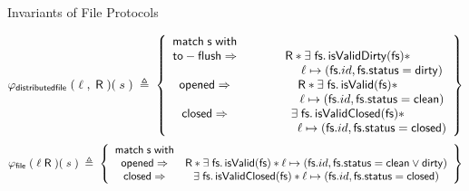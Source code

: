 \documentclass[aspectratio=169,xcolor=dvipsnames]{beamer}
\begin{document}
\begin{frame}{Invariants of File Protocols} \scriptsize
\begin{definition}    
    \[
\varphi_{\mathsf{distributedfile}} \;(\;\ell\;, \;\mathsf{R}\;)( \;s \; )\;\triangleq \;
\left\{
\begin{array}{cc}
\mathsf{match}\; \mathsf{s} \; \mathsf{with}\\
  \mathsf{to-flush} \Rightarrow  &  \mathsf{R} \ast \exists \; \mathsf{fs} \ldotp \mathsf{isValidDirty}(\mathsf{fs}) \ast \\ & \quad\quad\quad\quad \ell \mapsto (\mathsf{fs}.id,\mathsf{fs}.\mathsf{status}=\mathsf{dirty})  \\
   \mathsf{opened} \Rightarrow  &  \mathsf{R} \ast \exists \; \mathsf{fs} \ldotp \mathsf{isValid}(\mathsf{fs}) \ast \\ & \quad\quad\quad\quad \ell \mapsto (\mathsf{fs}.id,\mathsf{fs}.\mathsf{status}=\mathsf{clean}) \\
   \mathsf{closed} \Rightarrow  & \exists \; \mathsf{fs} \ldotp \mathsf{isValidClosed}(\mathsf{fs}) \ast \\ & \quad\quad\quad\quad \ell \mapsto (\mathsf{fs}.id,\mathsf{fs}.\mathsf{status}=\textsf{closed}) 
\end{array}
\right\}
\]
\[
\varphi_{\mathsf{file}} \;(\;\ell \;\mathsf{R}\;)( \;s \;)\; \triangleq \;
\left\{
\begin{array}{cc}
\mathsf{match}\; \mathsf{s} \; \mathsf{with}\\
   \mathsf{opened} \Rightarrow  &  \mathsf{R} \ast \exists \; \mathsf{fs} \ldotp \mathsf{isValid}(\mathsf{fs}) \ast \ell \mapsto (\mathsf{fs}.id,\mathsf{fs}.\mathsf{status}=\mathsf{clean} \lor \mathsf{dirty}) \\
   \mathsf{closed} \Rightarrow  & \exists \; \mathsf{fs} \ldotp \mathsf{isValidClosed}(\mathsf{fs}) \ast \ell \mapsto (\mathsf{fs}.id,\mathsf{fs}.\mathsf{status}=\mathsf{closed}) 
\end{array}
\right\}
\]
\end{definition}
\end{frame}
\end{document}
